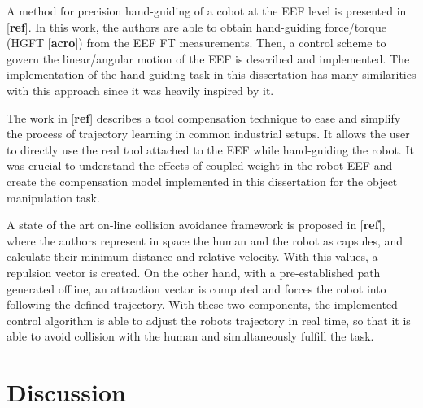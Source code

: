 \par A method for precision hand-guiding of a cobot at the EEF level is presented in [\textbf{ref}]. In this work, the authors are able to obtain hand-guiding force/torque (HGFT [\textbf{acro}]) from the EEF FT measurements. Then, a control scheme to govern the linear/angular motion of the EEF is described and implemented. The implementation of the hand-guiding task in this dissertation has many similarities with this approach since it was heavily inspired by it.
\par The work in [\textbf{ref}] describes a tool compensation technique to ease and simplify the process of trajectory learning in common industrial setups. It allows the user to directly use the real tool attached to the EEF while hand-guiding the robot. It was crucial to understand the effects of coupled weight in the robot EEF and create the compensation model implemented in this dissertation for the object manipulation task.
\par A state of the art on-line collision avoidance framework is proposed in [\textbf{ref}], where the authors represent in space the human and the robot as capsules, and calculate their minimum distance and relative velocity. With this values, a repulsion vector is created. On the other hand, with a pre-established path generated offline, an attraction vector is computed and forces the robot into following the defined trajectory. With these two components, the implemented control algorithm is able to adjust the robots trajectory in real time, so that it is able to avoid collision with the human and simultaneously fulfill the task.
\par 
\par 


\section{Discussion}


